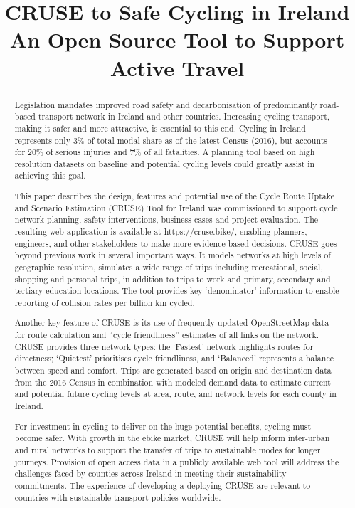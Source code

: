 \documentclass[
  super,
  preprint,
  3p]{elsarticle}
\begin{document}
\begin{frontmatter}
\title{CRUSE to Safe Cycling in Ireland \\\large{An Open Source Tool to
Support Active Travel} }


        
\begin{abstract}
Legislation mandates improved road safety and decarbonisation of
predominantly road-based transport network in Ireland and other
countries. Increasing cycling transport, making it safer and more
attractive, is essential to this end. Cycling in Ireland represents only
3\% of total modal share as of the latest Census (2016), but accounts
for 20\% of serious injuries and 7\% of all fatalities. A planning tool
based on high resolution datasets on baseline and potential cycling
levels could greatly assist in achieving this goal.

This paper describes the design, features and potential use of the Cycle
Route Uptake and Scenario Estimation (CRUSE) Tool for Ireland was
commissioned to support cycle network planning, safety interventions,
business cases and project evaluation. The resulting web application is
available at \url{https://cruse.bike/}, enabling planners, engineers,
and other stakeholders to make more evidence-based decisions. CRUSE goes
beyond previous work in several important ways. It models networks at
high levels of geographic resolution, simulates a wide range of trips
including recreational, social, shopping and personal trips, in addition
to trips to work and primary, secondary and tertiary education
locations. The tool provides key `denominator' information to enable
reporting of collision rates per billion km cycled.

Another key feature of CRUSE is its use of frequently-updated
OpenStreetMap data for route calculation and ``cycle friendliness''
estimates of all links on the network. CRUSE provides three network
types: the `Fastest' network highlights routes for directness;
`Quietest' prioritises cycle friendliness, and `Balanced' represents a
balance between speed and comfort. Trips are generated based on origin
and destination data from the 2016 Census in combination with modeled
demand data to estimate current and potential future cycling levels at
area, route, and network levels for each county in Ireland.

For investment in cycling to deliver on the huge potential benefits,
cycling must become safer. With growth in the ebike market, CRUSE will
help inform inter-urban and rural networks to support the transfer of
trips to sustainable modes for longer journeys. Provision of open access
data in a publicly available web tool will address the challenges faced
by counties across Ireland in meeting their sustainability commitments.
The experience of developing a deploying CRUSE are relevant to countries
with sustainable transport policies worldwide.
\end{abstract}






\end{frontmatter}
\end{document}
